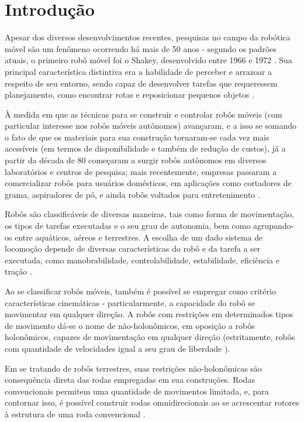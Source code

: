 \chapter{Introdução}

Apesar dos diversos desenvolvimentos recentes, pesquisas no campo da robótica móvel são um fenômeno ocorrendo há mais de 50 anos - segundo os padrões atuais, 
o primeiro robô móvel foi o Shakey, desenvolvido entre 1966 e 1972 \cite{TAKAHASHI}. 
Sua principal característica distintiva era a habilidade de perceber e arrazoar a respeito de seu entorno, 
sendo capaz de desenvolver tarefas que requeressem planejamento, como encontrar rotas e reposicionar pequenos objetos \cite{sri_international}.

À medida em que as técnicas para se construir e controlar robôs móveis (com particular interesse nos robôs móveis autônomos) avançaram, 
e a isso se somando o fato de que os materiais para sua construção tornaram-se cada vez mais acessíveis (em termos de disponibilidade 
e também de redução de custos), já a partir da década de 80 começaram a surgir robôs autônomos em diversos laboratórios e centros de pesquisa;
 mais recentemente, empresas passaram a comercializar robôs para usuários domésticos, em aplicações como cortadores de grama, aspiradores de pó, 
 e ainda robôs voltados para entretenimento \cite{TAKAHASHI}.

Robôs são classificáveis de diversas maneiras, tais como forma de movimentação, os tipos de tarefas executadas e o seu grau de autonomia, 
bem como agrupando-os entre aquáticos, aéreos e terrestres. A escolha de um dado sistema de locomoção depende de diversas características do robô e 
da tarefa a ser executada, como manobrabilidade, controlabilidade, estabilidade, eficiência e tração \cite{TAKAHASHI}.

Ao se classificar robôs móveis, também é possível se empregar como critério características cinemáticas - particularmente, 
a capacidade do robô se movimentar em qualquer direção. A robôs com restrições em determinados tipos de movimento dá-se o nome de não-holonômicos, 
em oposição a robôs holonômicos, capazes de movimentação em qualquer direção (estritamente, robôs com quantidade de velocidades igual a seu grau de liberdade \cite{TAKAHASHI}).

Em se tratando de robôs terrestres, suas restrições não-holonômicas são consequência direta das rodas empregadas em sua construções. 
Rodas convencionais permitem uma quantidade de movimentos limitada, e, para contornar isso, é possível construir rodas omnidirecionais ao se acrescentar rotores à estrutura de uma roda convencional \cite{TAKAHASHI}.
